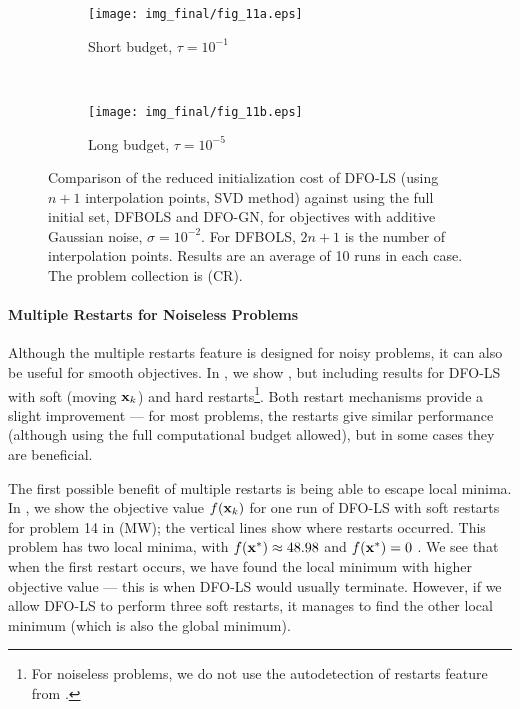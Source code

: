 \begin{figure}
	\centering
	\begin{subfigure}[b]{0.48\textwidth}
		\texttt{[image: img\_final/fig\_11a.eps]}
		\caption{Short budget, $\tau=10^{-1}$}
		\label{fig_cutest_noisy_short}
	\end{subfigure}
	~
	\begin{subfigure}[b]{0.48\textwidth}
		\texttt{[image: img\_final/fig\_11b.eps]}
		\caption{Long budget, $\tau=10^{-5}$}
		\label{fig_cutest_noisy_long}
	\end{subfigure}
	\caption{Comparison of the reduced initialization cost of DFO-LS (using $n+1$ interpolation points, SVD method) against using the full initial set, DFBOLS and DFO-GN, for objectives with additive Gaussian noise, $\sigma=10^{-2}$. For DFBOLS, $2n+1$ is the number of interpolation points. Results are an average of 10 runs in each case. The problem collection is (CR).}
	\label{fig_cutest_noisy}
\end{figure}

\paragraph{Multiple Restarts for Noiseless Problems}
Although the multiple restarts feature is designed for noisy problems, it can also be useful for smooth objectives.
In , we show , but including results for DFO-LS with soft (moving $\mathbf{x}_k$) and hard restarts\footnote{\:For noiseless problems, we do not use the autodetection of restarts feature from .}. 
Both restart mechanisms provide a slight improvement --- for most problems, the restarts give similar performance (although using the full computational budget allowed), but in some cases they are beneficial.

The first possible benefit of multiple restarts is being able to escape local minima.
In , we show the objective value $f(\mathbf{x}_k)$ for one run of DFO-LS with soft restarts for problem 14 in (MW); the vertical lines show where restarts occurred.
This problem has two local minima, with $f(\mathbf{x}^*)\approx 48.98$ and $f(\mathbf{x}^*)=0$ \cite{More1981}.
We see that when the first restart occurs, we have found the local minimum with higher objective value --- this is when DFO-LS would usually terminate.
However, if we allow DFO-LS to perform three soft restarts, it manages to find the other local minimum (which is also the global minimum).

